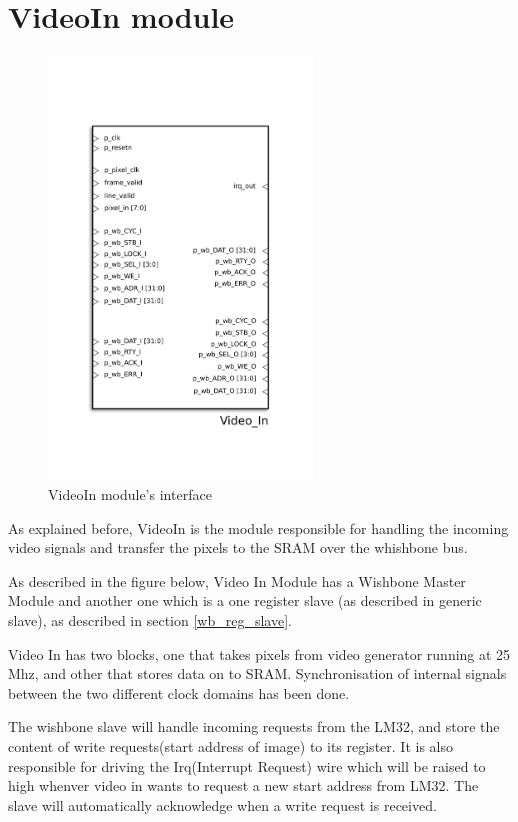 
\section{VideoIn module}
\begin{figure}[H]
\center
\includegraphics[width=7cm]{figs/Video_in.pdf}
\caption{VideoIn module's interface}
\label{VideoIn_interface}
\end{figure}

As explained before, VideoIn is the module responsible for handling the incoming video signals and transfer the pixels to the SRAM over the whishbone bus.

As described in the figure below, Video In Module has a Wishbone Master Module and another one which is a one register slave (as described in generic slave), as described in section \ref{wb_reg_slave}.

Video In has two blocks, one that takes pixels from video generator running at 25 Mhz, and other that stores data on to SRAM. Synchronisation of internal signals between the two different clock domains has been done.

The wishbone slave will handle incoming requests from the LM32, and store the content of write requests(start address of image) to its register. It is also responsible for driving the Irq(Interrupt Request) wire which will be raised to high whenver video in wants to request a new start address from LM32. The slave will automatically acknowledge when a write request is received.

